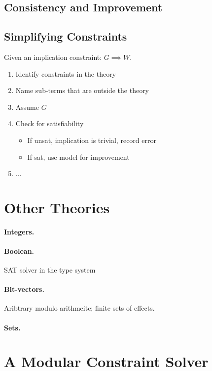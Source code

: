 \documentclass{sigplanconf}
\begin{document}
\subsection{Consistency and Improvement}

\subsection{Simplifying Constraints}



Given an implication constraint: $G\implies W$.
\begin{enumerate}
\item Identify constraints in the theory
\item Name sub-terms that are outside the theory
\item Assume $G$
\item Check for satisfiability
  \begin{itemize}
  \item If unsat, implication is trivial, record error
  \item If sat, use model for improvement
  \end{itemize}
\item ...
\end{enumerate}


\section{Other Theories}

\paragraph{Integers.}
\paragraph{Boolean.}  SAT solver in the type system
\paragraph{Bit-vectors.}  Aribtrary modulo arithmeitc; finite sets of effects.
\paragraph{Sets.}


\section{A Modular Constraint Solver}
\label{modular-typechecker}
\end{document}
